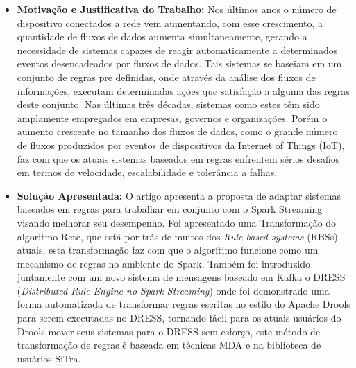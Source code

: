 \documentclass[tid,table]{texufpel} %
\begin{document}
\begin{itemize}
	\item \textbf{Motivação e Justificativa do Trabalho:} Nos últimos anos o número de dispositivo conectados a rede vem aumentando, com esse crescimento, a quantidade de fluxos de dados aumenta simultaneamente, gerando a necessidade de sistemas capazes de reagir automaticamente a determinados eventos desencadeados por fluxos de dados. Tais sistemas se baseiam em um conjunto de regras pre definidas, onde através da análise dos fluxos de informações, executam determinadas ações que satisfação a alguma das regras deste conjunto. Nas últimas três décadas, sistemas como estes têm sido amplamente empregados em empresas, governos e organizações. Porém o aumento crescente no tamanho dos fluxos de dados, como o grande número de fluxos produzidos por eventos de dispositivos da Internet of Things (IoT), faz com que os atuais sistemas baseados em regras enfrentem sérios desafios em termos de velocidade, escalabilidade e tolerância a falhas.
	
	\item \textbf{Solução Apresentada:} O artigo apresenta a proposta de adaptar sistemas baseados em regras para trabalhar em conjunto com o Spark Streaming visando melhorar seu desempenho. Foi apresentado uma Transformação do algoritmo Rete, que está por trás de muitos dos \textit{Rule based systems} (RBSs) atuais, esta transformação faz com que o algorítimo funcione como um mecanismo de regras no ambiente do Spark. Também foi introduzido juntamente com um novo sistema de mensagens baseado em Kafka o DRESS (\textit{Distributed Rule Engine no Spark Streaming}) onde foi demonstrado uma forma automatizada de transformar regras escritas no estilo do Apache Drools para serem executadas no DRESS, tornando fácil para os atuais usuários do Drools mover seus sistemas para o DRESS sem esforço, este método de transformação de regras é baseada em técnicas MDA e na biblioteca de usuários SiTra.
	

\end{itemize}
\end{document}
